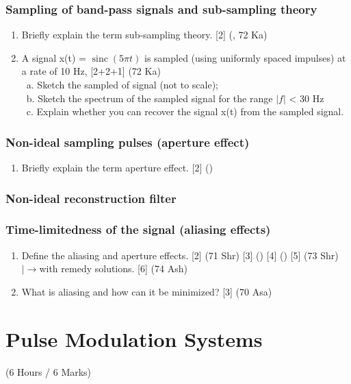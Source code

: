 \documentclass[12pt]{article}
\newcommand{\lb}{\\$\left|\rightarrow\right.$}
\newcommand{\enter}{\\\textcolor{white}{1}}
\DeclareMathOperator{\sinc}{sinc}
\begin{document}
    \subsubsection{Sampling of band-pass signals and sub-sampling theory}
    	\begin{enumerate}
    		\item Briefly explain the term sub-sampling theory. \hfill [2] (, 72 Ka)
    		
    		\item A signal x(t) = $\sinc(5\pi t)$ is sampled (using uniformly spaced impulses) at a rate of 10 Hz, \hfill [2+2+1] (72 Ka)
    		\enter a. Sketch the sampled of signal (not to scale);
    		\enter b. Sketch the spectrum of the sampled signal for the range $\left| f \right|$ < 30 Hz
    		\enter c. Explain whether you can recover the signal x(t) from the sampled signal.
    	\end{enumerate}
    
    \subsubsection{Non-ideal sampling pulses (aperture effect)}
    	\begin{enumerate}
    		\item Briefly explain the term aperture effect. \hfill [2] ()
    	\end{enumerate}
    
    \subsubsection{Non-ideal reconstruction filter}
    \subsubsection{Time-limitedness of the signal (aliasing effects)}
      \begin{enumerate}
        \item Define the aliasing and aperture effects. \hfill [2] (71 Shr) [3] () [4] () [5] (73 Shr)
        \lb with remedy solutions. \hfill [6] (74 Ash)
        
        \item What is aliasing and how can it be minimized? \hfill [3] (70 Asa)
      \end{enumerate}

\pagebreak

\section{Pulse Modulation Systems}
  \begin{center}(6 Hours / 6 Marks)\end{center}
\end{document}
